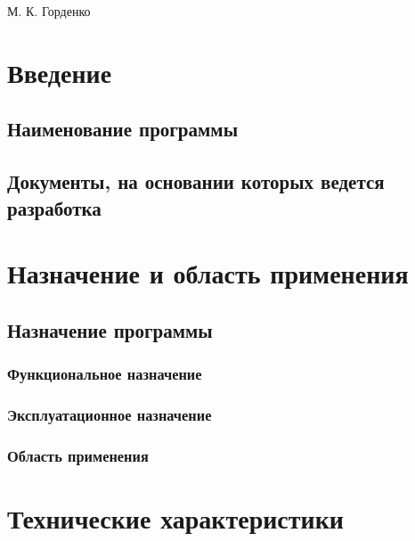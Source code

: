 \documentclass[a4paper,12pt]{article}
\begin{document}
    {М. К. Горденко}

    \firstPage
    \newpage
    \secondPage
    \newpage
    \thirdPage
    \newpage


    \section{Введение}

    \subsection{Наименование программы}

    \subsection{Документы, на основании которых ведется разработка}
    \newpage


    \section{Назначение и область применения}

    \subsection{Назначение программы }

    \subsubsection{Функциональное назначение }

    \subsubsection{Эксплуатационное назначение}

    \subsubsection{Область применения}

    \newpage


    \section{Технические характеристики}
\end{document}
